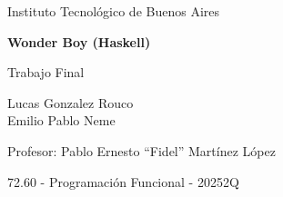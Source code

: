 \hypersetup{pageanchor=false}
\begin{titlepage}
  \centering

  {\Large Instituto Tecnológico de Buenos Aires\par}

  \vfill

  {\huge\bfseries Wonder Boy (Haskell)\par}
  \vspace{1.5em}
  {\Large Trabajo Final\par}

  \vfill

  {\large
    Lucas Gonzalez Rouco \\
    Emilio Pablo Neme
    \par
  }

  \vspace{2em}

  {\large
    Profesor: Pablo Ernesto ``Fidel'' Martínez López
    \par
  }

  \vspace{2em}

  {\large 72.60 - Programación Funcional - 20252Q\par}

  \vfill

\end{titlepage}
\hypersetup{pageanchor=true}
